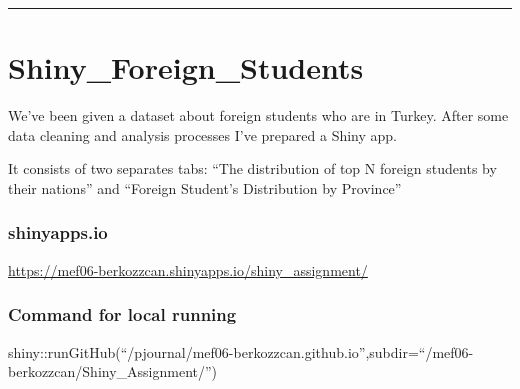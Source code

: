 \documentclass[
  letterpaper,
  DIV=11,
  numbers=noendperiod]{scrreprt}
\begin{document}
\begin{center}\rule{0.5\linewidth}{0.5pt}\end{center}


\hypertarget{shiny_foreign_students}{%
\chapter{Shiny\_Foreign\_Students}\label{shiny_foreign_students}}

We've been given a dataset about foreign students who are in Turkey.
After some data cleaning and analysis processes I've prepared a Shiny
app.

It consists of two separates tabs: ``The distribution of top N foreign
students by their nations'' and ``Foreign Student's Distribution by
Province''

\hypertarget{shinyapps.io}{%
\subsection{shinyapps.io}\label{shinyapps.io}}

\url{https://mef06-berkozzcan.shinyapps.io/shiny_assignment/}

\hypertarget{command-for-local-running}{%
\subsection{Command for local running}\label{command-for-local-running}}

shiny::runGitHub(``/pjournal/mef06-berkozzcan.github.io'',subdir=``/mef06-berkozzcan/Shiny\_Assignment/'')
\end{document}
